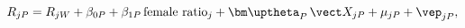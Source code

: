 \begin{equation}\label{equation2}
	R_{jP}=R_{jW}+\beta_{0P}+\beta_{1P}\,\text{female ratio}_j+\bm\uptheta_P\,\vect X_{jP}+\mu_{jP}+\vep_{jP},
\end{equation}